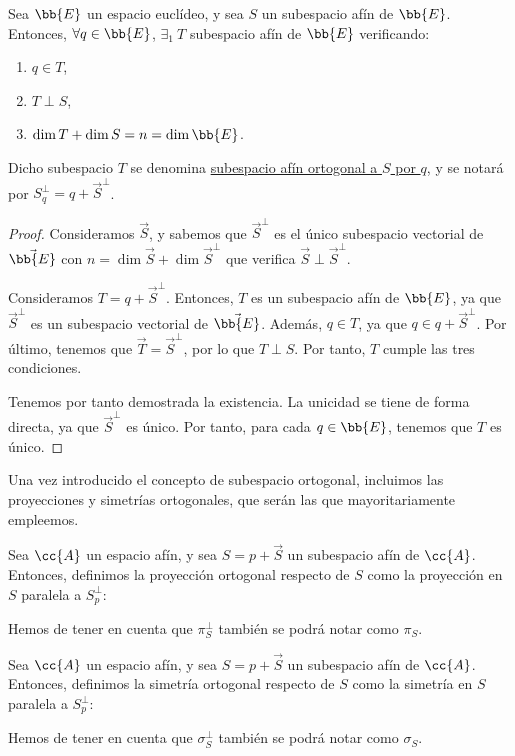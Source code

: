 \begin{teo}
    Sea $\bb{E}$ un espacio euclídeo, y sea $S$ un subespacio afín de $\bb{E}$. Entonces, $\forall q\in \bb{E}$, $\exists_1~ T$ subespacio afín de $\bb{E}$ verificando:
    \begin{enumerate}
        \item $q\in T$,
        \item $T\perp S$,
        \item $\dim T + \dim S = n=\dim \bb{E}$.
    \end{enumerate}
    Dicho subespacio $T$ se denomina \ul{subespacio afín ortogonal a $S$ por $q$}, y se notará por $S_q^\perp=q+\vec{S}^\perp$.
\end{teo}
\begin{proof}
    Consideramos $\vec{S}$, y sabemos que $\vec{S}^\perp$ es el único subespacio vectorial de $\vec{\bb{E}}$
    con $n=\dim \vec{S}+\dim \vec{S}^\perp$ que verifica $\vec{S}\perp \vec{S}^\perp$.

    Consideramos $T=q+\vec{S}^\perp$. Entonces, $T$ es un subespacio afín de $\bb{E}$, ya que $\vec{S}^\perp$ es un subespacio vectorial de $\vec{\bb{E}}$.
    Además, $q\in T$, ya que $q\in q+\vec{S}^\perp$. Por último, tenemos que $\vec{T}=\vec{S}^\perp$, por lo que $T\perp S$. Por tanto, $T$ cumple las tres condiciones.
    
    Tenemos por tanto demostrada la existencia. La unicidad se tiene de forma directa, ya que $\vec{S}^\perp$ es único. Por tanto, para cada $q\in \bb{E}$, tenemos que $T$ es único.
\end{proof}


Una vez introducido el concepto de subespacio ortogonal, incluimos las proyecciones y simetrías ortogonales,
que serán las que mayoritariamente empleemos.
\begin{definicion}
    Sea $\cc{A}$ un espacio afín, y sea $S=p+\vec{S}$ un subespacio afín de $\cc{A}$.
    Entonces, definimos la proyección ortogonal respecto de $S$ como la proyección en
    $S$ paralela a $S_p^\perp$:

    Hemos de tener en cuenta que $\pi_{S}^\perp$ también se podrá notar como $\pi_{S}$.
\end{definicion}

\begin{definicion}
    Sea $\cc{A}$ un espacio afín, y sea $S=p+\vec{S}$ un subespacio afín de $\cc{A}$.
    Entonces, definimos la simetría ortogonal respecto de $S$ como la simetría en
    $S$ paralela a $S_p^\perp$:

    Hemos de tener en cuenta que $\sigma_{S}^\perp$ también se podrá notar como $\sigma_{S}$.
\end{definicion}


